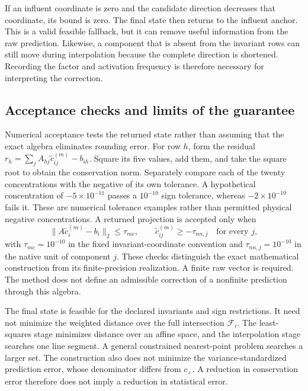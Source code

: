 If an influent coordinate is zero and the candidate direction decreases that coordinate, its bound is zero. The final state then returns to the influent anchor. This is a valid feasible fallback, but it can remove useful information from the raw prediction. Likewise, a component that is absent from the invariant rows can still move during interpolation because the complete direction is shortened. Recording the factor and activation frequency is therefore necessary for interpreting the correction.

\subsection{Acceptance checks and limits of the guarantee}

Numerical acceptance tests the returned state rather than assuming that the exact algebra eliminates rounding error. For row $h$, form the residual $r_h=\sum_jA_{hj}\tilde c_{ij}^{(m)}-b_{ih}$. Square its five values, add them, and take the square root to obtain the conservation norm. Separately compare each of the twenty concentrations with the negative of its own tolerance. A hypothetical concentration of $-5\times10^{-11}$ passes a $10^{-10}$ sign tolerance, whereas $-2\times10^{-10}$ fails it. These are numerical tolerance examples rather than permitted physical negative concentrations. A returned projection is accepted only when
\begin{equation}
\|A\tilde c_i^{(m)}-b_i\|_2\leq\tau_{mc},\qquad
\tilde c_{ij}^{(m)}\geq-\tau_{nn,j}\quad\text{for every }j,
\label{eq:projection_numerical_acceptance}
\end{equation}
with $\tau_{mc}=10^{-10}$ in the fixed invariant-coordinate convention and $\tau_{nn,j}=10^{-10}$ in the native unit of component $j$. These checks distinguish the exact mathematical construction from its finite-precision realization. A finite raw vector is required. The method does not define an admissible correction of a nonfinite prediction through this algebra.

The final state is feasible for the declared invariants and sign restrictions. It need not minimize the weighted distance over the full intersection $\mathcal{F}_i$. The least-squares stage minimizes distance over an affine space, and the interpolation stage searches one line segment. A general constrained nearest-point problem searches a larger set. The construction also does not minimize the variance-standardized prediction error, whose denominator differs from $c_+$. A reduction in conservation error therefore does not imply a reduction in statistical error.

